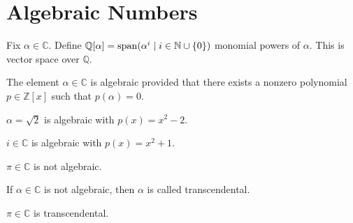 
\section{Algebraic Numbers}
\begin{definition}
    Fix \(\alpha \in \mathbb{C} \). Define \(\mathbb{Q} [\alpha ] = \operatorname{span}(\alpha ^i\mid i \in \mathbb{N} \cup \{ 0 \} )\) monomial powers of \(\alpha \). This is vector space over \(\mathbb{Q} \).   
\end{definition}

\begin{definition}
    The element \(\alpha \in \mathbb{C} \) is algebraic provided that there exists a nonzero polynomial \(p \in \mathbb{Z}[x]\) such that \(p(\alpha )=0\).   
\end{definition}
\begin{eg}
    \(\alpha = \sqrt{2} \) is algebraic with \(p(x) = x^2 - 2\).
\end{eg}
\begin{eg}
    \(i \in \mathbb{C}  \) is algebraic with \(p(x) = x^2 + 1\).
\end{eg}
\begin{eg}
    \(\pi \in \mathbb{C}  \) is not algebraic.
\end{eg}

\begin{definition}
    If \(\alpha  \in \mathbb{C} \) is not algebraic, then \(\alpha \) is called transcendental.  
\end{definition}
\begin{eg}
    \(\pi \in \mathbb{C} \) is transcendental. 
\end{eg}

